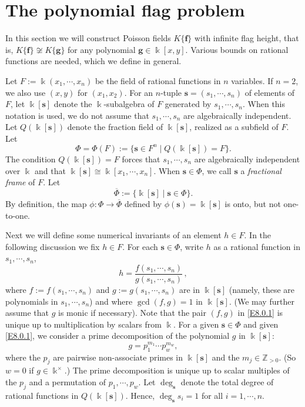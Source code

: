 \documentclass[12pt]{amsart}
\theoremstyle{plain}
\numberwithin{theorem}{section}
\numberwithin{equation}{theorem}
\theoremstyle{definition}
\newcommand{\bfs}{\mathbf{s}}
\newcommand{\ZZ}{\mathbb{Z}}
\newcommand \bff {{\mathbf{f}}}
\newcommand \bfg {{\mathbf{g}}}
\newcommand \Zpos {\ZZ_{> 0}}
\begin{document}

\section{The polynomial flag problem}
\label{zzsec8}

In this section we will construct Poisson fields $K\{\bff\}$ 
with infinite flag height, that is, $K\{\bff\} \not\cong K\{\bfg\}$ for any polynomial $\bfg \in \Bbbk[x,y]$.  Various bounds on rational functions are needed, which we define in general.

Let $F:=\Bbbk(x_1,\cdots,x_n)$ be the field of rational 
functions in $n$ variables. If $n=2$, we also use $(x,y)$ for 
$(x_1,x_2)$. For an $n$-tuple $\bfs = (s_1,\cdots,s_n)$ of 
elements of $F$, let $\Bbbk[\bfs]$ denote the $\Bbbk$-subalgebra 
of $F$ generated by $s_1,\cdots, s_n$. When this notation is used, 
we do not assume that $s_1,\cdots,s_n$ are algebraically 
independent. Let $Q(\Bbbk[\bfs])$ denote the fraction field of 
$\Bbbk[\bfs]$, realized as a subfield of $F$. Let
$$\Phi = \Phi(F) :=\{ \bfs \in F^n \mid Q(\Bbbk[\bfs])=F\}.$$
The condition $Q(\Bbbk[\bfs])=F$ forces that $s_1,\cdots,s_n$
are algebraically independent over $\Bbbk$ and that $\Bbbk[\bfs]
\cong \Bbbk[x_1,\cdots,x_n]$. When $\bfs \in \Phi$, 
we call $\bfs$ a {\it fractional frame} of $F$. Let
$$\overline{\Phi}:=
\{ \Bbbk[\bfs]\mid \bfs \in \Phi\}.$$
By definition, the map $\phi:\Phi\to \overline{\Phi}$ defined 
by $\phi(\bfs)=\Bbbk[\bfs]$ is onto, but not one-to-one. 

Next we will define some numerical invariants of an element 
$h\in F$. In the following discussion we fix $h\in F$. For each 
$\bfs \in \Phi$, write $h$ as a rational function in 
$s_1,\cdots,s_n$,
\begin{equation}
\label{E8.0.1}\tag{E8.0.1}
h=\frac{f(s_1,\cdots,s_n)}{g(s_1,\cdots,s_n)} \,,
\end{equation}
where $f:=f(s_1,\cdots,s_n)$ and $g:=g(s_1,\cdots,s_n)$ are in 
$\Bbbk[\bfs]$ (namely, these are polynomials in $s_1,\cdots,s_n$) 
and where $\gcd(f,g)=1$ in $\Bbbk[\bfs]$. (We may further assume that $g$ is monic if necessary). Note that the pair 
$(f,g)$ in \eqref{E8.0.1} is unique up to multiplication by scalars from 
$\Bbbk$. For a given $\bfs \in \Phi$ and given \eqref{E8.0.1}, we 
consider a prime decomposition of the polynomial $g$ in 
$\Bbbk[\bfs]$:
\begin{equation}
\label{E8.0.2}\tag{E8.0.2}
g=p_1^{m_1}\cdots p_w^{m_w},
\end{equation}
where the $p_j$ are pairwise non-associate primes in $\Bbbk[\bfs]$ and 
the $m_j \in \Zpos$. (So $w=0$ if $g\in \Bbbk^{\times}$.)  The prime 
decomposition is unique up to scalar multiples of the $p_j$ and 
a permutation of $p_1,\cdots,p_w$. Let $\deg_{\bfs}$ denote the 
total degree of rational functions in $Q(\Bbbk[\bfs])$. Hence, 
$\deg_{\bfs} s_i=1$ for all $i=1,\cdots,n$. 
\end{document}
